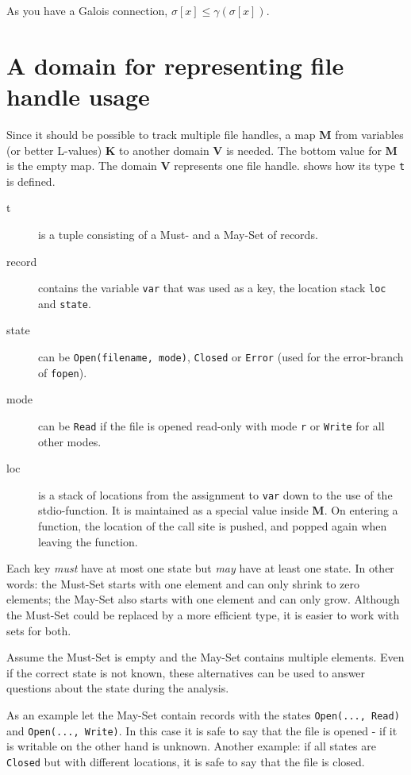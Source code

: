 As you have a Galois connection, $\sigma[x] \leq \gamma(\sigma[x])$.\\


\section{A domain for representing file handle usage}
Since it should be possible to track multiple file handles, a map \textbf{M} from variables (or better L-values) \textbf{K} to another domain \textbf{V} is needed. The bottom value for \textbf{M} is the empty map.
The domain \textbf{V} represents one file handle.  shows how its type \verb|t| is defined.
\begin{description}
\item[t] is a tuple consisting of a Must- and a May-Set of records.

\item[record] contains the variable \verb|var| that was used as a key, the location stack \verb|loc| and \verb|state|.

\item[state] can be \verb|Open(filename, mode)|, \verb|Closed| or \verb|Error| (used for the error-branch of \verb|fopen|).

\item[mode] can be \verb|Read| if the file is opened read-only with mode \verb|r| or \verb|Write| for all other modes.

\item[loc] is a stack of locations from the assignment to \verb|var| down to the use of the stdio-function. It is maintained as a special value inside \textbf{M}. On entering a function, the location of the call site is pushed, and popped again when leaving the function.
\end{description}
Each key \textit{must} have at most one state but \textit{may} have at least one state.
In other words: the Must-Set starts with one element and can only shrink to zero elements; the May-Set also starts with one element and can only grow.
Although the Must-Set could be replaced by a more efficient type, it is easier to work with sets for both.

Assume the Must-Set is empty and the May-Set contains multiple elements. Even if the correct state is not known, these alternatives can be used to answer questions about the state during the analysis.

As an example let the May-Set contain records with the states \verb|Open(..., Read)| and \verb|Open(..., Write)|. In this case it is safe to say that the file is opened - if it is writable on the other hand is unknown. Another example: if all states are \verb|Closed| but with different locations, it is safe to say that the file is closed. %

